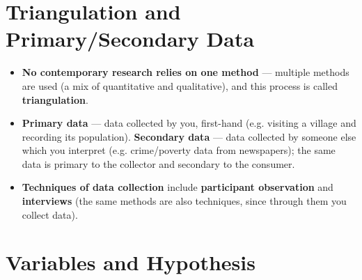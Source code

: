 \section{Triangulation and Primary/Secondary Data}

\begin{KeyConcept}
\begin{itemize}
\item \textbf{No contemporary research relies on one method} --- multiple methods are used (a mix of quantitative and qualitative), and this process is called \textbf{triangulation}.
\item \textbf{Primary data} --- data collected by you, first-hand (e.g. visiting a village and recording its population). \textbf{Secondary data} --- data collected by someone else which you interpret (e.g. crime/poverty data from newspapers); the same data is primary to the collector and secondary to the consumer.
\item \textbf{Techniques of data collection} include \textbf{participant observation} and \textbf{interviews} (the same methods are also techniques, since through them you collect data).
\end{itemize}
\end{KeyConcept}

\section{Variables and Hypothesis}

